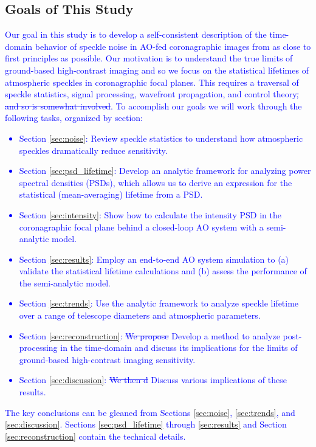 \documentclass[10pt,preprint]{aastex631}
\newcommand{\jrmadd}[1]{\textcolor{blue}{#1}}
\newcommand{\jrmrmv}[1]{\textcolor{blue}{\sout{#1}}}
\newcommand{\mpfrmv}[1]{\textcolor{avocado}{\sout{#1}}}
\begin{document}
\subsection{Goals of This Study}
\jrmadd{Our goal in this study is to develop a self-consistent description of the time-domain behavior of speckle noise in AO-fed coronagraphic images from as close to first principles as possible.  Our motivation is to understand the true limits of ground-based high-contrast imaging and so we focus on the statistical lifetimes of atmospheric speckles in coronagraphic focal planes.   This requires a traversal of speckle statistics, signal processing, wavefront propagation, and control theory\mpfrmv{, and so is somewhat involved}. To accomplish our goals we will work through the following tasks, organized by section:
\begin{itemize}
\item Section \ref{sec:noise}: Review speckle statistics to understand how atmospheric speckles dramatically reduce sensitivity.
\item Section \ref{sec:psd_lifetime}: Develop an analytic framework for analyzing power spectral densities (PSDs), which allows us to derive an expression for the statistical (mean-averaging) lifetime from a PSD.
\item Section \ref{sec:intensity}: Show how to calculate the intensity PSD in the coronagraphic focal plane behind a closed-loop AO system with a semi-analytic model.
\item Section \ref{sec:results}: Employ an end-to-end AO system simulation to (a) validate the statistical lifetime calculations and (b) assess the performance of the semi-analytic model.
\item Section \ref{sec:trends}: Use the analytic framework to analyze speckle lifetime over a range of telescope diameters and atmospheric parameters.
\item Section \ref{sec:reconstruction}: \jrmrmv{We propose} \jrmadd{Develop} a method to analyze post-processing in the time-domain and discuss its implications for the limits of ground-based high-contrast imaging sensitivity.
\item Section \ref{sec:discussion}: \jrmrmv{We then d} \jrmadd{D}iscuss various implications of these results.
\end{itemize}
The key conclusions can be gleaned from Sections \ref{sec:noise}, \ref{sec:trends}, and \ref{sec:discussion}. Sections \ref{sec:psd_lifetime} through \ref{sec:results} and Section \ref{sec:reconstruction} contain the technical details.  }
\end{document}
